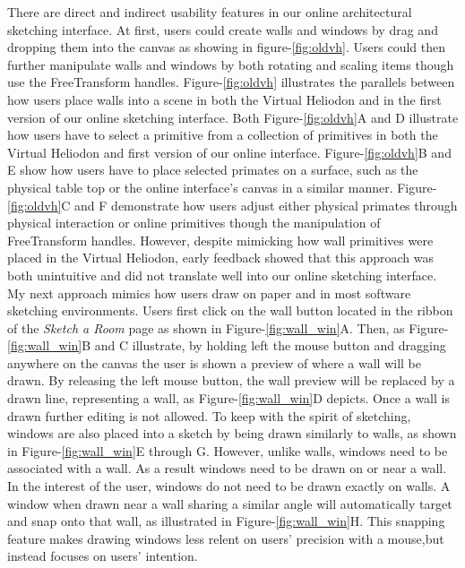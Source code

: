 		There are direct and indirect usability features in our online architectural sketching interface.
		At first, users could create walls and windows by drag and dropping them into the canvas as showing in figure-\ref{fig:oldvh}.
		Users could then further manipulate walls and windows by both rotating and scaling items though use the FreeTransform handles. 
		Figure-\ref{fig:oldvh} illustrates the parallels between how users place walls into a scene in both the Virtual Heliodon and in the first version of our online sketching interface.
		Both Figure-\ref{fig:oldvh}A and D illustrate how users have to select a primitive from a collection of primitives in both the Virtual Heliodon and first version of our online interface.
		Figure-\ref{fig:oldvh}B and E show how users have to place selected primates on a surface, such as the physical table top or the online interface's canvas in a similar manner.
		Figure-\ref{fig:oldvh}C and F demonstrate how users adjust either physical primates through physical interaction or online primitives though the manipulation of FreeTransform handles.
		However, despite mimicking how wall primitives were placed in the Virtual Heliodon, early feedback showed that this approach was both unintuitive and did not translate well into our online sketching interface.\\

		My next approach mimics how users draw on paper and in most software sketching environments.
		Users first click on the wall button located in the ribbon of the \textit{Sketch a Room} page as shown in Figure-\ref{fig:wall_win}A.
		Then, as Figure-\ref{fig:wall_win}B and C illustrate, by holding left the mouse button and dragging anywhere on the canvas the user is shown a preview of where a wall will be drawn.
		By releasing the left mouse button, the wall preview will be replaced by a drawn line, representing a wall, as Figure-\ref{fig:wall_win}D depicts.
		Once a wall is drawn further editing is not allowed.
		To keep with the spirit of sketching, windows are also placed into a sketch by being drawn similarly to walls, as shown in Figure-\ref{fig:wall_win}E through G.
		However, unlike walls, windows need to be associated with a wall.
		As a result windows need to be drawn on or near a wall.
		In the interest of the user, windows do not need to be drawn exactly on walls.
		A window when drawn near a wall sharing a similar angle will automatically target and snap onto that wall, as illustrated in Figure-\ref{fig:wall_win}H.
		This snapping feature makes drawing windows less relent on users' precision with a mouse,but instead focuses on users' intention. \\

